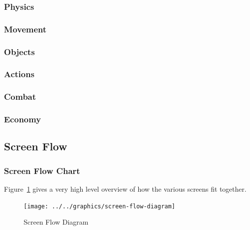 \documentclass[12pt,titlepage]{article}
\begin{document}
\subsubsection{Physics}

\subsubsection{Movement}

\subsubsection{Objects}

\subsubsection{Actions}

\subsubsection{Combat}

\subsubsection{Economy}

\subsection{Screen Flow}

\subsubsection{Screen Flow Chart}
Figure~\ref{fig:screen_flow_chart} gives a very high level overview of how the
various screens fit together.
\begin{figure}[H]
    \centering
    \caption{Screen Flow Diagram}
    \label{fig:screen_flow_chart}
    \texttt{[image: ../../graphics/screen-flow-diagram]}
\end{figure}
\end{document}

